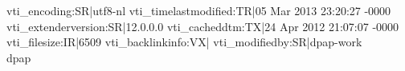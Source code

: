 vti_encoding:SR|utf8-nl
vti_timelastmodified:TR|05 Mar 2013 23:20:27 -0000
vti_extenderversion:SR|12.0.0.0
vti_cacheddtm:TX|24 Apr 2012 21:07:07 -0000
vti_filesize:IR|6509
vti_backlinkinfo:VX|
vti_modifiedby:SR|dpap-work\\dpap

